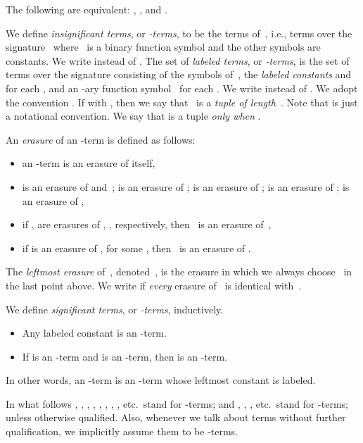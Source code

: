 \documentclass[a4paper,UKenglish]{lipics-v2016}
\begin{document}
\begin{lemma}\label{lem_clc_equivalent}
  The following are equivalent: , ,
  and .
\end{lemma}

\begin{definition}\label{def_terms}
  We define \emph{insignificant terms}, or \emph{-terms}, to be the
  terms of~, i.e., terms over the
  signature~ where~ is a
  binary function symbol and the other symbols are constants. We write
   instead of .  The set of \emph{labeled terms},
  or \emph{-terms}, is the set of terms over the signature
  consisting of the symbols of~, the \emph{labeled constants}
   and  for
  each , and an -ary function
  symbol~ for each . We write
   instead of . We
  adopt the convention . If
   with , then we say
  that~ is a \emph{tuple of length~}. Note that
   is just a notational convention. We say that
   is a tuple \emph{only when }.

  An \emph{erasure} of an -term is defined as follows:
  \begin{itemize}
  \item an -term is an erasure of itself,
  \item  is an erasure of  and~;  is an erasure of
    ;  is an erasure of ;  is an erasure of ; 
    is an erasure of ,
  \item if ,  are erasures of , , respectively,
    then~ is an erasure of~,
  \item if  is an erasure of , for some ,
    then~ is an erasure of .
  \end{itemize}
  The \emph{leftmost erasure} of~, denoted~, is the
  erasure in which we always choose~ in the last point above. We
  write  if \emph{every} erasure of~ is identical
  with~.

  We define \emph{significant terms}, or \emph{-terms},
  inductively.
  \begin{itemize}
  \item Any labeled constant is an -term.
  \item If  is an -term and  is an -term, then  is an -term.
  \end{itemize}
  In other words, an -term is an -term whose leftmost constant
  is labeled.
\end{definition}

In what follows , , , , , , , ,
etc.~stand for -terms; and , , , etc.~stand for
-terms; unless otherwise qualified. Also, whenever we talk about
terms without further qualification, we implicitly assume them to be
-terms.
\end{document}
